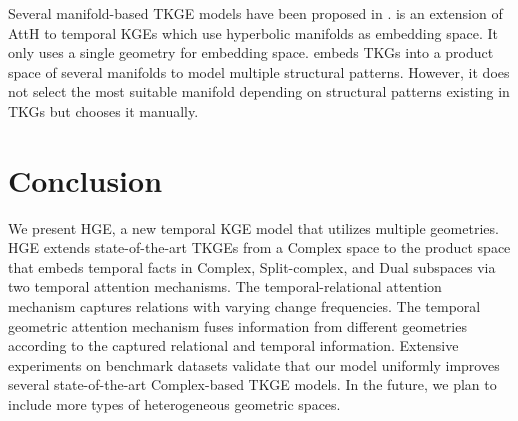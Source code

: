 \documentclass[letterpaper]{article} %
\begin{document}
Several manifold-based TKGE models have been proposed in \cite{herculemontella2021hyperbolic,han2020dyernie}.
\cite{herculemontella2021hyperbolic} is an extension of AttH \cite{chami2020low} to temporal KGEs which use hyperbolic manifolds as embedding space. It only uses a single geometry for embedding space.
\cite{han2020dyernie} embeds TKGs into a product space of several manifolds to model multiple structural patterns. However, it does not select the most suitable manifold depending on structural patterns existing in TKGs but chooses it manually.




\section{Conclusion}
We present HGE, a new temporal KGE model that utilizes multiple geometries. HGE extends state-of-the-art TKGEs from a Complex space to the product space that embeds temporal facts in Complex, Split-complex, and Dual subspaces via two temporal attention mechanisms. The temporal-relational attention mechanism captures relations with varying change frequencies. The temporal geometric attention mechanism fuses information from different geometries according to the captured relational and temporal information. Extensive experiments on benchmark datasets validate that our model uniformly improves several state-of-the-art Complex-based TKGE models. In the future, we plan to include more types of heterogeneous geometric spaces. 

\end{document}
